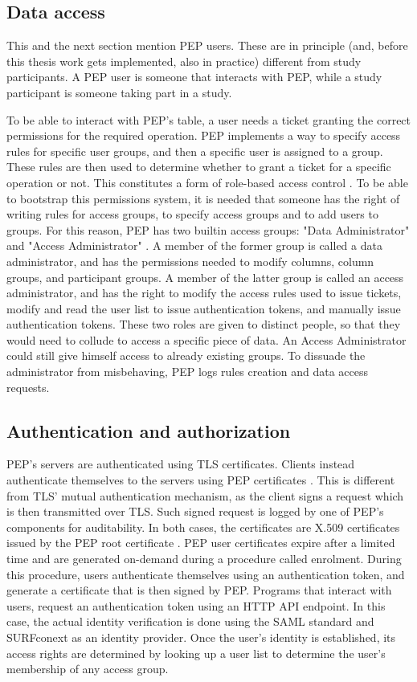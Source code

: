 \documentclass{report}
\begin{document}
\subsection{Data access} \label{data_access}
This and the next section mention PEP users. These are in principle (and, before this thesis work gets implemented, also in  practice) different from study participants. A PEP user is
someone that interacts with PEP, while a study participant is someone taking part in a study. \par
To be able to interact with PEP's table, a user needs a ticket granting the correct permissions for the required operation. PEP implements a way to specify access rules for
specific user groups, and then a specific user is assigned to a group. These rules are then used to determine whether to grant a ticket for a specific operation or not. This
constitutes a form of role-based access control \cite{rbac}. To be able to bootstrap this permissions system, it is needed that someone has the right of writing rules for access
groups, to specify access groups and to add users to groups. For this reason, PEP has two builtin access groups: "Data Administrator" and "Access Administrator" \cite{pep-blueprint}. A
member of the former group is called a data administrator, and has the permissions needed to modify columns, column groups, and participant groups. A member of the latter group is
called an access administrator, and has the right to modify the access rules used to issue tickets, modify and read the user list to issue authentication tokens, and manually issue
authentication tokens. These two roles are given to distinct people, so that they would need to collude to access a specific piece of data. An Access Administrator could still
give himself access to already existing groups. To dissuade the administrator from misbehaving, PEP logs rules creation and data access requests.

\subsection{Authentication and authorization}
PEP's servers are authenticated using TLS certificates. Clients instead authenticate themselves to the servers using PEP certificates \cite{pep-blueprint}. This is different from
TLS' mutual authentication mechanism, as the client signs a request which is then transmitted over TLS. Such signed request is logged by one of PEP's components for auditability. In
both cases, the certificates are X.509 certificates \cite{X.509} issued by the PEP root certificate \cite{pep-blueprint}. PEP user certificates expire after a limited time and are
generated on-demand during a procedure called enrolment. During this procedure, users authenticate themselves using an authentication token, and generate a certificate that is then
signed by PEP. Programs that interact with users, request an authentication token using an HTTP API endpoint. In this case, the actual identity verification is done using the SAML
standard \cite{sstc-saml-core-errata-2.0-wd-07} and SURFconext \cite{surfconext} as an identity provider. Once the user's identity is established, its access rights are determined
by looking up a user list to determine the user's membership of any access group. 
\end{document}
